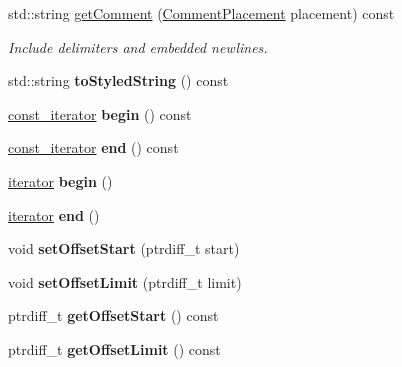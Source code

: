 \begin{DoxyCompactItemize}
\item 
\mbox{\label{class_json_1_1_value_a8fc2d59502fbb4fbb3b641b07ec0e069}} 
std\+::string \hyperlink{class_json_1_1_value_a8fc2d59502fbb4fbb3b641b07ec0e069}{get\+Comment} (\hyperlink{namespace_json_a4fc417c23905b2ae9e2c47d197a45351}{Comment\+Placement} placement) const
\begin{DoxyCompactList}\small\item\em Include delimiters and embedded newlines. \end{DoxyCompactList}\item 
\mbox{\label{class_json_1_1_value_a3696d34c1a1833742b4bf8e5b247f125}} 
std\+::string {\bfseries to\+Styled\+String} () const
\item 
\mbox{\label{class_json_1_1_value_a015459a3950c198d63a2d3be8f5ae296}} 
\hyperlink{class_json_1_1_value_const_iterator}{const\+\_\+iterator} {\bfseries begin} () const
\item 
\mbox{\label{class_json_1_1_value_a3e443cd0ef24f7e028b175e47ee045e0}} 
\hyperlink{class_json_1_1_value_const_iterator}{const\+\_\+iterator} {\bfseries end} () const
\item 
\mbox{\label{class_json_1_1_value_a2d45bb2e68e8f22fe356d7d955ebd3c9}} 
\hyperlink{class_json_1_1_value_iterator}{iterator} {\bfseries begin} ()
\item 
\mbox{\label{class_json_1_1_value_a2f961eff73f7f79cd29260b6cbd42558}} 
\hyperlink{class_json_1_1_value_iterator}{iterator} {\bfseries end} ()
\item 
\mbox{\label{class_json_1_1_value_a92e32ea0f4f8a15853a3cf0beac9feb9}} 
void {\bfseries set\+Offset\+Start} (ptrdiff\+\_\+t start)
\item 
\mbox{\label{class_json_1_1_value_a5e4f5853fec138150c5df6004a8c2bcf}} 
void {\bfseries set\+Offset\+Limit} (ptrdiff\+\_\+t limit)
\item 
\mbox{\label{class_json_1_1_value_afa081dc764000951a1d8d6148155508e}} 
ptrdiff\+\_\+t {\bfseries get\+Offset\+Start} () const
\item 
\mbox{\label{class_json_1_1_value_a2cdfa01935f87fcace90d450cbd2c0a4}} 
ptrdiff\+\_\+t {\bfseries get\+Offset\+Limit} () const
\end{DoxyCompactItemize}
